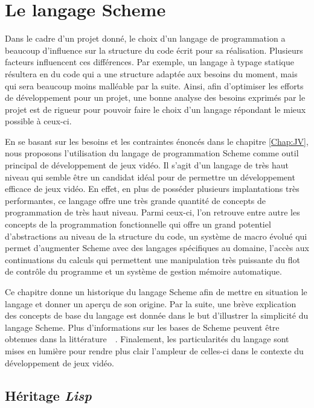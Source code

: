 \documentclass[12pt,oneside,letterpaper,francais]{book}
\newcommand{\lisp}{{\textit{Lisp }}}
\begin{document}
\chapter{Le langage Scheme}
\label{Chap:Scheme}

Dans le cadre d'un projet donné, le choix d'un langage de
programmation a beaucoup d'influence sur la structure du code écrit
pour sa réalisation. Plusieurs facteurs influencent ces
différences. Par exemple, un langage à typage statique résultera en du
code qui a une structure adaptée aux besoins du moment, mais qui sera
beaucoup moins malléable par la suite. Ainsi, afin d'optimiser les
efforts de développement pour un projet, une bonne analyse des besoins
exprimés par le projet est de rigueur pour pouvoir faire le choix d'un
langage répondant le mieux possible à ceux-ci.

En se basant sur les besoins et les contraintes énoncés dans le
chapitre \ref{Chap:JV}, nous proposons l'utilisation du langage de
programmation Scheme comme outil principal de développement de jeux
vidéo. Il s'agit d'un langage de très haut niveau qui semble être un
candidat idéal pour de permettre un développement efficace de jeux
vidéo. En effet, en plus de posséder plusieurs implantations très
performantes, ce langage offre une très grande quantité de concepts de
programmation de très haut niveau. Parmi ceux-ci, l'on retrouve entre
autre les concepts de la programmation fonctionnelle qui offre un
grand potentiel d'abstractions au niveau de la structure du code, un
système de macro évolué qui permet d'augmenter Scheme avec des
langages spécifiques au domaine, l'accès aux continuations du calculs
qui permettent une manipulation très puissante du flot de contrôle du
programme et un système de gestion mémoire automatique.

Ce chapitre donne un historique du langage Scheme afin de mettre en
situation le langage et donner un aperçu de son origine. Par la suite,
une brève explication des concepts de base du langage est donnée dans
le but d'illustrer la simplicité du langage Scheme. Plus
d'informations sur les bases de Scheme peuvent être obtenues dans la
littérature~\cite{R5RS}~\cite{SICP}. Finalement, les particularités du
langage sont mises en lumière pour rendre plus clair l'ampleur de
celles-ci dans le contexte du développement de jeux vidéo.

\section{Héritage \lisp}
\label{Scheme:hist}
\end{document}
